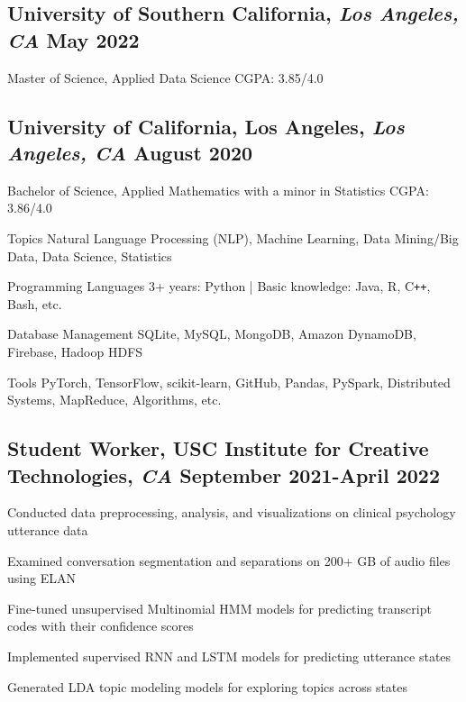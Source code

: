 \documentclass[11pt]{article}
\begin{document}
\subsection*{University of Southern California{\normalfont, \textit{Los Angeles, CA} \hfill May 2022}}
\noindent
Master of Science, Applied Data Science
\hfill
CGPA: 3.85/4.0


\subsection*{University of California, Los Angeles{\normalfont, \textit{Los Angeles, CA} \hfill August 2020}}
\noindent
Bachelor of Science, Applied Mathematics with a minor in Statistics
\hfill
CGPA: 3.86/4.0

\vspace{0.1in}

\vspace{0.05in}
\begin{compactdesc}
	\item[Topics] Natural Language Processing (NLP), Machine Learning, Data Mining/Big Data, Data Science, Statistics
    \item[Programming Languages] 3+ years: Python | Basic knowledge: Java, R, C\texttt{++}, Bash, etc.
    \item[Database Management] SQLite, MySQL, MongoDB, Amazon DynamoDB, Firebase, Hadoop HDFS
    \item[Tools] PyTorch, TensorFlow, scikit-learn, GitHub, Pandas, PySpark, Distributed Systems, MapReduce, Algorithms, etc.
\end{compactdesc}

\vspace{0.1in}

\subsection*{Student Worker{\normalfont, USC Institute for Creative
            Technologies,
            \textit{CA} \hfill
            September 2021-April 2022}}
\begin{compactitem}
    \item Conducted data preprocessing, analysis, and visualizations on clinical psychology utterance data
    \item Examined conversation segmentation and separations on 200+ GB of audio files using ELAN
    \item Fine-tuned unsupervised Multinomial HMM models for predicting transcript codes with their confidence scores
    \item Implemented supervised RNN and LSTM models for predicting utterance states
    \item Generated LDA topic modeling models for exploring topics across states
\end{compactitem}
\end{document}
